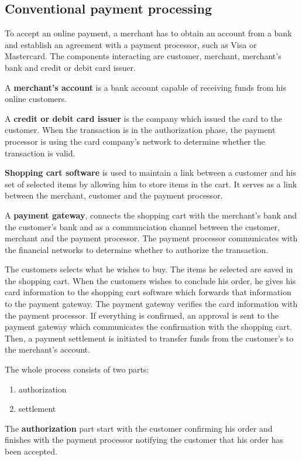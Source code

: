 \documentclass{ferseminar}
\begin{document}
\subsection{Conventional payment processing}
To accept an online payment, a merchant has to obtain an account from a bank and establish an agreement with a payment processor, such as Visa or Mastercard. The components interacting are customer, merchant, merchant's bank and credit or debit card issuer.

A \textbf{merchant's account} is a bank account capable of receiving funds from his online customers. 

A \textbf{credit or debit card issuer} is the company which issued the card to the customer. When the transaction is in the authorization phase, the payment processor is using the card company's network to determine whether the transaction is valid.

\textbf{Shopping cart software} is used to maintain a link between a customer and his set of selected items by allowing him to store items in the cart. It serves as a link between the merchant, customer and the payment processor.

A \textbf{payment gateway}, connects the shopping cart with the merchant's bank and the customer's bank and as a communciation channel between the customer, merchant and the payment processor. The payment processor communicates with the financial networks to determine whether to authorize the transaction. 

The customers selects what he wishes to buy. The items he selected are saved in the shopping cart. When the customers wishes to conclude his order, he gives his card information to the shopping cart software which forwards that information to the payment gateway. The payment gateway verifies the card information with the payment processor. If everything is confirmed, an approval is sent to the payment gateway which communicates the confirmation with the shopping cart. Then, a payment settlement is initiated to transfer funds from the customer's to the merchant's account. 

The whole process consists of two parts:
\begin{enumerate}
	\item authorization
	\item settlement
\end{enumerate}

The \textbf{authorization} part start with the customer confirming his order and finishes with the payment processor notifying the customer that his order has been accepted.
\end{document}
